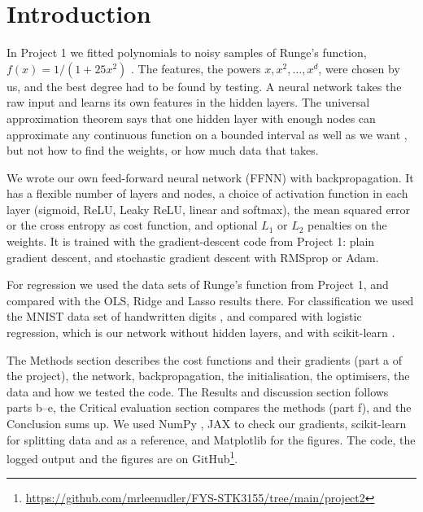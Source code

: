 
\section*{Introduction}

In Project 1 we fitted polynomials to noisy samples of Runge's function, $f(x) = 1/(1 + 25x^2)$ \cite{Runge1901}. The features, the powers $x, x^2, \dots, x^d$, were chosen by us, and the best degree had to be found by testing. A neural network takes the raw input and learns its own features in the hidden layers. The universal approximation theorem says that one hidden layer with enough nodes can approximate any continuous function on a bounded interval as well as we want \cite[Sec.~8.4]{HjorthJensen2026}, but not how to find the weights, or how much data that takes.

We wrote our own feed-forward neural network (FFNN) with backpropagation. It has a flexible number of layers and nodes, a choice of activation function in each layer (sigmoid, ReLU, Leaky ReLU, linear and softmax), the mean squared error or the cross entropy as cost function, and optional $L_1$ or $L_2$ penalties on the weights. It is trained with the gradient-descent code from Project 1: plain gradient descent, and stochastic gradient descent with RMSprop or Adam.

For regression we used the data sets of Runge's function from Project 1, and compared with the OLS, Ridge and Lasso results there. For classification we used the MNIST data set of handwritten digits \cite{LeCun2010MNIST}, and compared with logistic regression, which is our network without hidden layers, and with scikit-learn \cite{Pedregosa2011}.

The Methods section describes the cost functions and their gradients (part a of the project), the network, backpropagation, the initialisation, the optimisers, the data and how we tested the code. The Results and discussion section follows parts b--e, the Critical evaluation section compares the methods (part f), and the Conclusion sums up. We used NumPy \cite{Harris2020}, JAX \cite{Jax2018} to check our gradients, scikit-learn for splitting data and as a reference, and Matplotlib \cite{Hunter2007} for the figures. The code, the logged output and the figures are on GitHub\footnote{\url{https://github.com/mrleenudler/FYS-STK3155/tree/main/project2}}.
